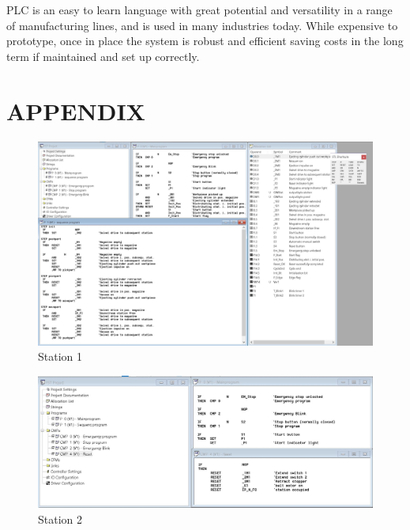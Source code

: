 \documentclass[a4paper, 10pt,  conference]{article}
\begin{document}
PLC is an easy to learn language with great potential and versatility in a range of manufacturing lines, and is used in many industries today. While expensive to prototype, once in place the system is robust and efficient saving costs in the long term if maintained and set up correctly.



\nocite{*}




\clearpage
\section*{APPENDIX}

\begin{figure}[h!]
  \includegraphics[width=\linewidth]{images/1}
  \caption{Station 1}
  \label{fig:Station 1}
\end{figure}

\begin{figure}[h!]
  \includegraphics[width=\linewidth]{images/2}
  \caption{Station 2}
  \label{fig:Station 2}
\end{figure}
\end{document}
